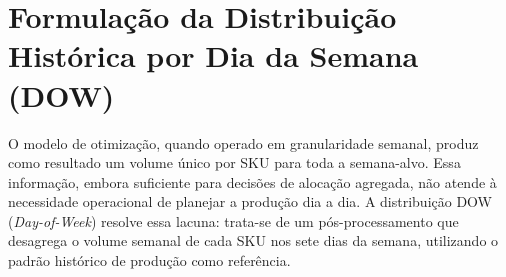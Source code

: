 \documentclass[11pt,a4paper]{article}
\begin{document}




\section{Formulação da Distribuição Histórica por Dia da Semana (DOW)}

O modelo de otimização, quando operado em granularidade semanal, produz como
resultado um volume único por SKU para toda a semana-alvo. Essa informação,
embora suficiente para decisões de alocação agregada, não atende à necessidade
operacional de planejar a produção dia a dia. A distribuição DOW
(\emph{Day-of-Week}) resolve essa lacuna: trata-se de um pós-processamento que
desagrega o volume semanal de cada SKU nos sete dias da semana, utilizando o
padrão histórico de produção como referência.
\end{document}
